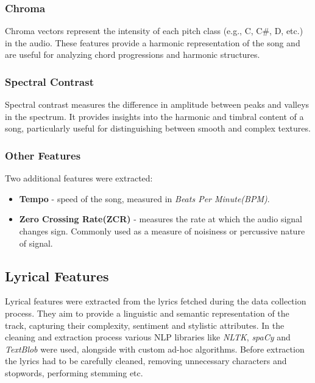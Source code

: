\subsubsection*{Chroma}
Chroma vectors represent the intensity of each pitch class (e.g., C, C#, D, etc.) in the audio.
These features provide a harmonic representation of the song and are useful for analyzing
chord progressions and harmonic structures.

\subsubsection*{Spectral Contrast}
Spectral contrast measures the difference in amplitude between peaks and
valleys in the spectrum. It provides insights into the harmonic and timbral
content of a song, particularly useful for distinguishing between smooth and
complex textures.

\subsubsection*{Other Features}
Two additional features were extracted:
\begin{itemize}
  \item \textbf{Tempo} - speed of the song, measured in
    \textit{Beats Per Minute(BPM)}.
  \item \textbf{Zero Crossing Rate(ZCR)} - measures the rate at which the audio
    signal changes sign. Commonly used as a measure of noisiness or
    percussive nature of signal.
\end{itemize}


\subsection{Lyrical Features}
\label{sec:lyricalfeatures}

Lyrical features  were extracted from the lyrics fetched during the data
collection process. They aim to provide a linguistic and semantic
representation of the track, capturing their complexity, sentiment and
stylistic  attributes. In the cleaning and extraction  process various NLP
libraries like \textit{NLTK}, \textit{spaCy} and \textit{TextBlob} were used,
alongside with custom ad-hoc algorithms. Before extraction the lyrics  had to
be carefully cleaned, removing unnecessary characters and stopwords, performing
stemming etc.\cite{nltk} \cite{spacy} \cite{textblob} 

